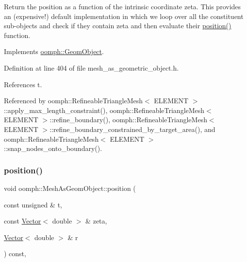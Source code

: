Return the position as a function of the intrinsic coordinate zeta. This provides an (expensive!) default implementation in which we loop over all the constituent sub-\/objects and check if they contain zeta and then evaluate their \hyperlink{classoomph_1_1MeshAsGeomObject_ad071793f5cee36eef0e56dbeeebf4c24}{position()} function. 



Implements \hyperlink{classoomph_1_1GeomObject_a0d04c9d4667817f3ef24bb660fd56065}{oomph\+::\+Geom\+Object}.



Definition at line 404 of file mesh\+\_\+as\+\_\+geometric\+\_\+object.\+h.



References t.



Referenced by oomph\+::\+Refineable\+Triangle\+Mesh$<$ E\+L\+E\+M\+E\+N\+T $>$\+::apply\+\_\+max\+\_\+length\+\_\+constraint(), oomph\+::\+Refineable\+Triangle\+Mesh$<$ E\+L\+E\+M\+E\+N\+T $>$\+::refine\+\_\+boundary(), oomph\+::\+Refineable\+Triangle\+Mesh$<$ E\+L\+E\+M\+E\+N\+T $>$\+::refine\+\_\+boundary\+\_\+constrained\+\_\+by\+\_\+target\+\_\+area(), and oomph\+::\+Refineable\+Triangle\+Mesh$<$ E\+L\+E\+M\+E\+N\+T $>$\+::snap\+\_\+nodes\+\_\+onto\+\_\+boundary().

\mbox{\label{classoomph_1_1MeshAsGeomObject_aab712c9f8a51d997c13c00eb1afaf9f4}} 
\subsubsection{\texorpdfstring{position()}{position()}\hspace{0.1cm}{\footnotesize\ttfamily [2/2]}}
{\footnotesize\ttfamily void oomph\+::\+Mesh\+As\+Geom\+Object\+::position (\begin{DoxyParamCaption}\item[{const unsigned \&}]{t,  }\item[{const \hyperlink{classoomph_1_1Vector}{Vector}$<$ double $>$ \&}]{zeta,  }\item[{\hyperlink{classoomph_1_1Vector}{Vector}$<$ double $>$ \&}]{r }\end{DoxyParamCaption}) const\hspace{0.3cm}{\ttfamily [inline]}, {\ttfamily [virtual]}}



